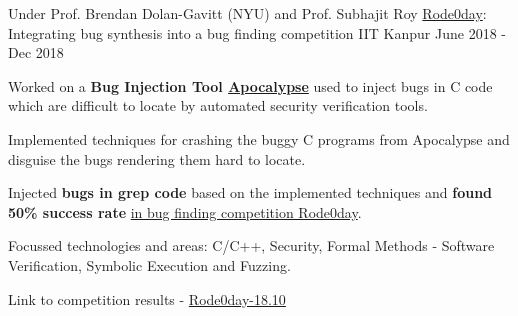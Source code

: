 \begin{cventries}


  \cventry
    {Under Prof. Brendan Dolan-Gavitt (NYU) and Prof. Subhajit Roy} %
    {\href{https://rode0day.mit.edu/}{Rode0day}: Integrating bug synthesis into a bug finding competition} %
    {IIT Kanpur} %
    {June 2018 - Dec 2018} %
    {
      \begin{cvitems} %
        \item {Worked on a \textbf{Bug Injection Tool \href{https://dl.acm.org/doi/abs/10.1145/3236024.3236084}{Apocalypse}} used to inject bugs in C code which are difficult to locate by automated security verification tools.}
        \item {Implemented techniques for crashing the buggy C programs from Apocalypse and disguise the bugs rendering them hard to locate.}
        \item {Injected \textbf{bugs in grep code} based on the implemented techniques and \textbf{found 50\% success rate} \href{https://rode0day.mit.edu/results/4}{in bug finding competition Rode0day}.}
        \item {Focussed technologies and areas: C/C++, Security, Formal Methods - Software Verification, Symbolic Execution and Fuzzing.}
        \item {Link to competition results - \href{https://rode0day.mit.edu/results/4}{Rode0day-18.10}}
      \end{cvitems}
    }




\end{cventries}
